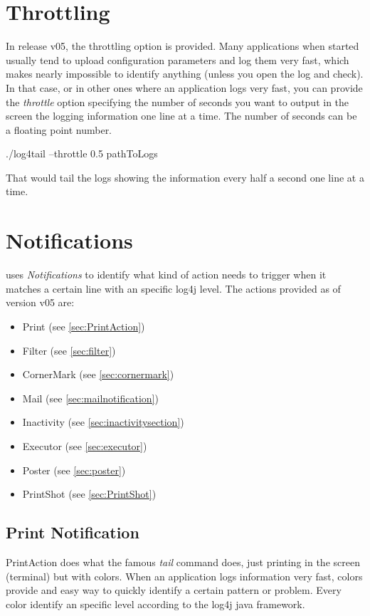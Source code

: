 \section{Throttling}
In release v05, the throttling option is provided. Many applications when
started usually tend to upload configuration parameters and log them very fast,
which makes nearly impossible to identify anything (unless you open the log and
check). In that case, or in other ones where an application logs very fast, you
can provide the \emph{throttle} option specifying the number of seconds you want
to output in the screen the logging information one line at a time. The number 
of seconds can be a floating point number.
\begin{cmd}
 ./log4tail --throttle 0.5 pathToLogs
\end{cmd}
That would tail the logs showing the information every half a second one line at 
a time.


\section{Notifications}
\logftailer{} uses \emph{Notifications} to identify what kind of action needs to
trigger when it matches a certain line with an specific log4j level. The actions
provided as of version v05 are:
\begin{itemize}
 \item Print (see \autoref{sec:PrintAction})
 \item Filter (see \autoref{sec:filter})
 \item CornerMark (see \autoref{sec:cornermark})
 \item Mail (see \autoref{sec:mailnotification})
 \item Inactivity (see \autoref{sec:inactivitysection})
 \item Executor (see \autoref{sec:executor})
 \item Poster (see \autoref{sec:poster})
 \item PrintShot (see \autoref{sec:PrintShot})
\end{itemize}

\subsection{Print Notification}
\label{sec:PrintAction}
PrintAction does what the famous \emph{tail} command does, just printing in the
screen (terminal) but with colors. When an application logs information very
fast, colors provide and easy way to quickly identify a certain pattern or
problem. Every color identify an specific level according to the log4j java
framework.

